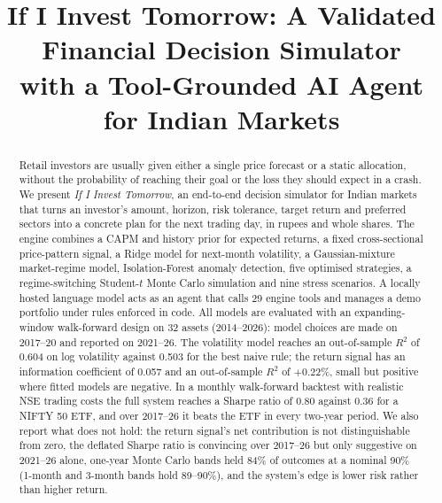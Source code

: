 \documentclass[conference]{IEEEtran}
\begin{document}
\title{If I Invest Tomorrow: A Validated Financial Decision Simulator\\ with a Tool-Grounded AI Agent for Indian Markets}

\author{
\and
{}
\and
{}
\and
{}
\and
{}
}

\maketitle

\begin{abstract}
Retail investors are usually given either a single price forecast or a static allocation, without the probability of reaching their goal or the loss they should expect in a crash. We present \emph{If I Invest Tomorrow}, an end-to-end decision simulator for Indian markets that turns an investor's amount, horizon, risk tolerance, target return and preferred sectors into a concrete plan for the next trading day, in rupees and whole shares. The engine combines a CAPM and history prior for expected returns, a fixed cross-sectional price-pattern signal, a Ridge model for next-month volatility, a Gaussian-mixture market-regime model, Isolation-Forest anomaly detection, five optimised strategies, a regime-switching Student-$t$ Monte Carlo simulation and nine stress scenarios. A locally hosted language model acts as an agent that calls 29 engine tools and manages a demo portfolio under rules enforced in code. All models are evaluated with an expanding-window walk-forward design on 32 assets (2014--2026): model choices are made on 2017--20 and reported on 2021--26. The volatility model reaches an out-of-sample $R^2$ of 0.604 on log volatility against 0.503 for the best naive rule; the return signal has an information coefficient of 0.057 and an out-of-sample $R^2$ of $+0.22\%$, small but positive where fitted models are negative. In a monthly walk-forward backtest with realistic NSE trading costs the full system reaches a Sharpe ratio of 0.80 against 0.36 for a NIFTY 50 ETF, and over 2017--26 it beats the ETF in every two-year period. We also report what does not hold: the return signal's net contribution is not distinguishable from zero, the deflated Sharpe ratio is convincing over 2017--26 but only suggestive on 2021--26 alone, one-year Monte Carlo bands held 84\% of outcomes at a nominal 90\% (1-month and 3-month bands hold 89--90\%), and the system's edge is lower risk rather than higher return.
\end{abstract}
\end{document}
